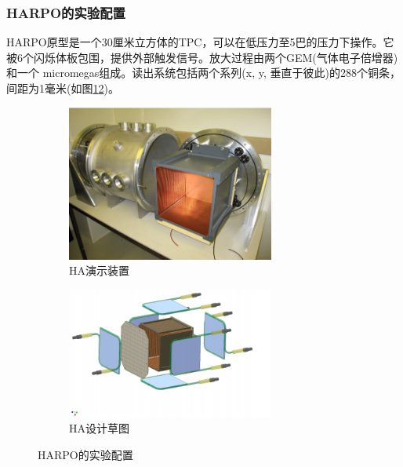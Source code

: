 \subsubsection{HARPO的实验配置}
	HARPO原型是一个30厘米立方体的TPC，可以在低压力至5巴的压力下操作。它被6个闪烁体板包围，提供外部触发信号。放大过程由两个GEM(气体电子倍增器)和一个
	micromegas组成。读出系统包括两个系列(x, y, 垂直于彼此)的288个铜条，间距为1毫米(如图\ref{fig:sub1}\ref{fig:sub2})。
	\begin{figure}[htbp]
		\centering
		\begin{subfigure}[b]{0.45\textwidth}
			\includegraphics[width=0.75\textwidth]{figures/HA演示装置.png}
			\caption{HA演示装置}
			\label{fig:sub1}
		\end{subfigure}
		\hspace{0.01\textwidth} %
		\begin{subfigure}[b]{0.45\textwidth}
			\includegraphics[width=0.75\textwidth]{figures/HA设计草图.png}
			\caption{HA设计草图}
			\label{fig:sub2}
		\end{subfigure}
		\caption{HARPO的实验配置}
		\label{fig:figures}
	\end{figure}

